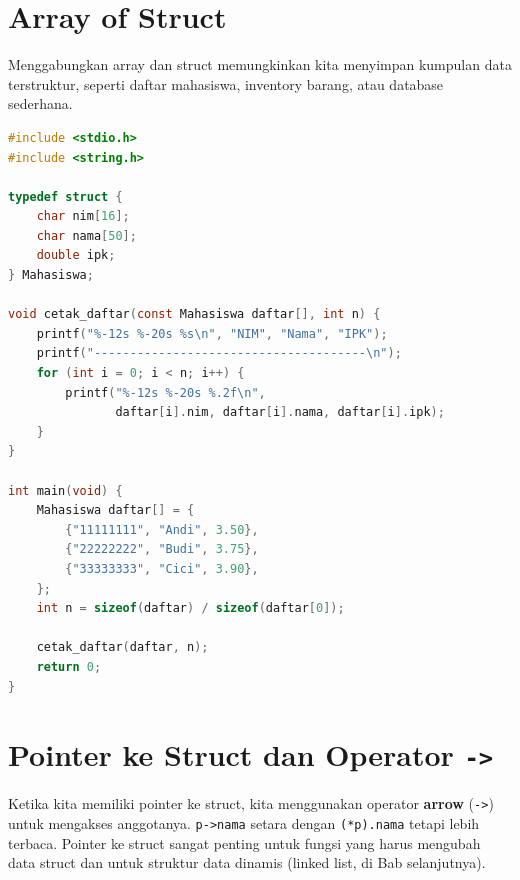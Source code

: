 \documentclass[../main.tex]{subfiles}
\begin{document}
\section{Array of Struct}

Menggabungkan array dan struct memungkinkan kita menyimpan kumpulan data terstruktur, seperti daftar mahasiswa, inventory barang, atau database sederhana.

\begin{lstlisting}[language=C,caption=Array of struct --- daftar mahasiswa]
#include <stdio.h>
#include <string.h>

typedef struct {
    char nim[16];
    char nama[50];
    double ipk;
} Mahasiswa;

void cetak_daftar(const Mahasiswa daftar[], int n) {
    printf("%-12s %-20s %s\n", "NIM", "Nama", "IPK");
    printf("--------------------------------------\n");
    for (int i = 0; i < n; i++) {
        printf("%-12s %-20s %.2f\n",
               daftar[i].nim, daftar[i].nama, daftar[i].ipk);
    }
}

int main(void) {
    Mahasiswa daftar[] = {
        {"11111111", "Andi", 3.50},
        {"22222222", "Budi", 3.75},
        {"33333333", "Cici", 3.90},
    };
    int n = sizeof(daftar) / sizeof(daftar[0]);
    
    cetak_daftar(daftar, n);
    return 0;
}
\end{lstlisting}



\section{Pointer ke Struct dan Operator \texttt{->}}

Ketika kita memiliki pointer ke struct, kita menggunakan operator \textbf{arrow} (\texttt{->}) untuk mengakses anggotanya. \texttt{p->nama} setara dengan \texttt{(*p).nama} tetapi lebih terbaca. Pointer ke struct sangat penting untuk fungsi yang harus mengubah data struct dan untuk struktur data dinamis (linked list, di Bab selanjutnya).
\end{document}
